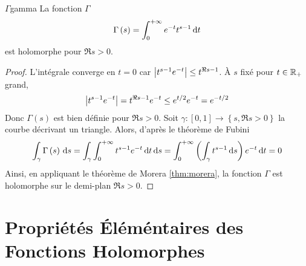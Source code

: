 \documentclass{cours}
\begin{document}
\begin{corollaire}{$\Gamma$}{gamma}
    La fonction $\Gamma$
    \begin{equation*}
        \Gamma\left(s\right) = \int_{0}^{+\infty}e^{-t}t^{s - 1}{\rm \, d} t
    \end{equation*}
    est holomorphe pour $\Re s > 0$.
\end{corollaire}

\begin{proof}
    L'intégrale converge en $t = 0$ car $\left|t^{s - 1}e^{-t}\right| \leq t^{\Re s  - 1}$. À $s$ fixé pour $t \in \mathbb{R}_{+}$ grand, 
    \begin{equation*}
        \left|t^{s - 1}e^{-t}\right| = t^{\Re s - 1}e^{-t}\leq e^{t/2}e^{-t} = e^{-t/2}
    \end{equation*}
    Donc $\Gamma\left(s\right)$ est bien définie pour $\Re s > 0$. Soit $\gamma : \left[0, 1\right] \to \left\{s, \Re s > 0\right\}$ la courbe décrivant un triangle. Alors, d'après le théorème de Fubini 
    \begin{equation*}
        \int_{\gamma}\Gamma\left(s\right) {\rm \, d} s = \int_{\gamma}\int_{0}^{+\infty}t^{s - 1}e^{-t}{\rm \, d} t{\rm \, d} s = \int_{0}^{+ \infty}\left(\int_{\gamma}t^{s-1}{\rm \, d} s\right)e^{-t}{\rm \, d} t = 0
    \end{equation*}
    Ainsi, en appliquant le théorème de Morera \ref{thm:morera}, la fonction $\Gamma$ est holomorphe sur le demi-plan $\Re s > 0$.
\end{proof}

\section{Propriétés Éléméntaires des Fonctions Holomorphes}
\end{document}
